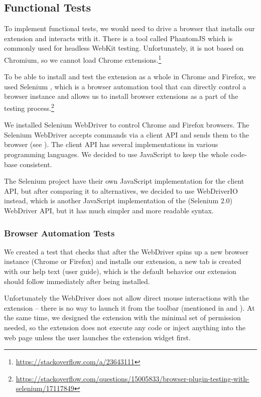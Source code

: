 \documentclass[bsc,frontabs,twoside,singlespacing,parskip,deptreport]{infthesis}
\begin{document}
\subsection{Functional Tests}
To implement functional tests, we would need to drive a browser that installs our extension and interacts with it. There is a tool called PhantomJS \cite{A14} which is commonly used for headless WebKit testing. Unfortunately, it is not based on Chromium, so we cannot load Chrome extensions.\footnote{\url{https://stackoverflow.com/a/23643111}}

To be able to install and test the extension as a whole in Chrome and Firefox, we used Selenium \cite{A15}, which is a browser automation tool that can directly control a browser instance and allows us to install browser extensions as a part of the testing process.\footnote{\url{https://stackoverflow.com/questions/15005833/browser-plugin-testing-with-selenium/17117849}}

We installed Selenium WebDriver to control Chrome and Firefox browsers. The Selenium WebDriver accepts commands via a client API and sends them to the browser (see \cite{W2}). The client API has several implementations in various programming languages. We decided to use JavaScript to keep the whole code-base consistent. 

The Selenium project have their own JavaScript implementation for the client API, but after comparing it to alternatives, we decided to use WebDriverIO \cite{A16} instead, which is another JavaScript implementation of the (Selenium 2.0) WebDriver API, but it has much simpler and more readable syntax.

\subsubsection{Browser Automation Tests}
We created a test that checks that after the WebDriver spins up a new browser instance (Chrome or Firefox) and installs our extension, a new tab is created with our help text (user guide), which is the default behavior our extension should follow immediately after being installed.

Unfortunately the WebDriver does not allow direct mouse interactions with the extension -- there is no way to launch it from the toolbar (mentioned in \cite{A17} and \cite{A18}). At the same time, we designed the extension with the minimal set of permission needed, so the extension does not execute any code or inject anything into the web page unless the user launches the extension widget first.
\end{document}
